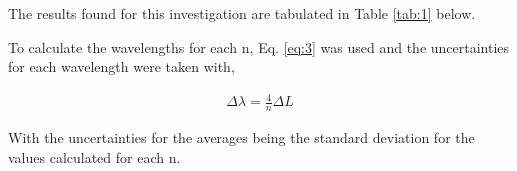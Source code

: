 \documentclass[12pt]{article}
\begin{document}
The results found for this investigation are tabulated in Table \ref{tab:1} below.

\begin{table}[H]
    \centering
    \caption{Table of the results found for different tube length resonances.}
    \label{tab:1}
\end{table}

To calculate the wavelengths for each n, Eq. \ref{eq:3} was used and the uncertainties for each wavelength were taken with,

\vspace{-2ex}
\begin{gather*}
    \Delta \lambda = \frac{4}{n} \Delta L
\end{gather*}

With the uncertainties for the averages being the standard deviation for the values calculated for each n.
\end{document}
